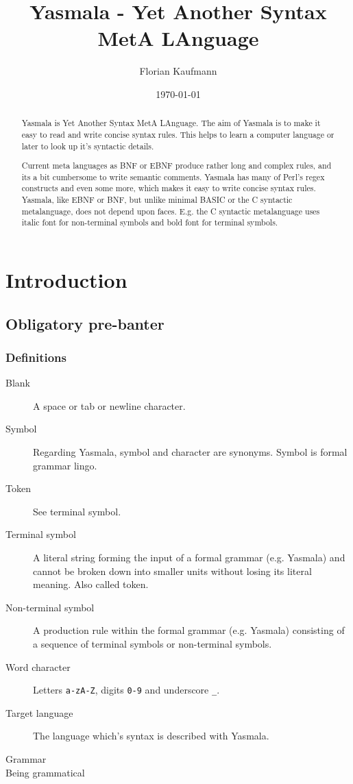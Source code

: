 \documentclass[a4paper]{report}
\begin{document}
\author{Florian Kaufmann}
\title{Yasmala - Yet Another Syntax MetA LAnguage}
\date{\today}
\maketitle

\begin{abstract}
Yasmala is Yet Another Syntax MetA LAnguage. The aim of Yasmala is to make it
easy to read and write concise syntax rules. This helps to learn a computer
language or later to look up it's syntactic details.

Current meta languages as BNF or EBNF produce rather long and complex rules, and
its a bit cumbersome to write semantic comments. Yasmala has many of Perl's
regex constructs and even some more, which makes it easy to write concise syntax
rules. Yasmala, like EBNF or BNF, but unlike minimal BASIC or the C syntactic
metalanguage, does not depend upon faces. E.g. the C syntactic metalanguage uses
italic font for non-terminal symbols and bold font for terminal symbols.
\end{abstract}

\tableofcontents

\chapter{Introduction}

\section{Obligatory pre-banter}

\subsection{Definitions}

\begin{description}
\item[Blank] A space or tab or newline character.
\item[Symbol] Regarding Yasmala, symbol and character are synonyms. Symbol is
     formal grammar lingo.
\item[Token] See terminal symbol.
\item[Terminal symbol] A literal string forming the input of a formal grammar
     (e.g. Yasmala) and cannot be broken down into smaller units without losing
     its literal meaning. Also called token.
\item[Non-terminal symbol] A production rule within the formal grammar (e.g.
     Yasmala) consisting of a sequence of terminal symbols or non-terminal
     symbols. 
\item[Word character] Letters \verb|a-zA-Z|, digits \verb|0-9| and underscore \verb|_|. 
\item[Target language] The language which's syntax is described with Yasmala.
\item[Grammar]  
\item[Being grammatical] 
\end{description}
\end{document}

